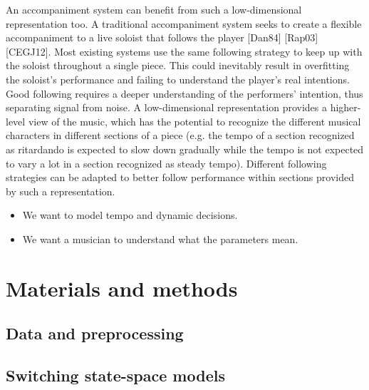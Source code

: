 \documentclass[12pt]{article}
\begin{document}
An accompaniment system can benefit from such a low-dimensional
representation too. A traditional accompaniment system seeks to create
a flexible accompaniment to a live soloist that follows the player
[Dan84] [Rap03] [CEGJ12]. Most existing systems use the same following
strategy to keep up with the soloist throughout a single piece. This
could inevitably result in overfitting the soloist’s performance and
failing to understand the player’s real intentions. Good following
requires a deeper understanding of the performers’ intention, thus
separating signal from noise. A low-dimensional representation
provides a higher-level view of the music, which has the potential to
recognize the different musical characters in different sections of a
piece (e.g. the tempo of a section recognized as ritardando is
expected to slow down gradually while the tempo is not expected to
vary a lot in a section recognized as steady tempo). Different
following strategies can be adapted to better follow performance
within sections provided by such a representation. 

\begin{itemize}
\item We want to model tempo and dynamic decisions.
\item We want a musician to understand what the parameters mean.
\end{itemize}



\section{Materials and methods}




\subsection{Data and preprocessing}

\subsection{Switching state-space models}
\end{document}
